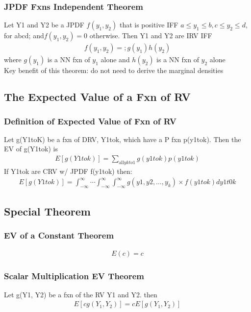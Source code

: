 \documentclass[12pt]{article}
\begin{document}
	\subsubsection{JPDF Fxns Independent Theorem}
		Let Y1 and Y2 be a JPDF $ f(y_1, y_2) $ that is positive IFF
		$ a\le y_1\le b, c\le y_2\le d $, for abcd; and$ f(y_1, y_2)= 0 $
		otherwise. Then Y1 and Y2 are IRV IFF
		\begin{align*}
			f(y_1, y_2) = ;g(y_1)h(y_2)
		\end{align*}
		where $ g(y_1) $ is a NN fxn of $ y_1 $ alone and $ h(y_2) $
		is a NN fxn of $ y_2 $ alone\\
		Key benefit of this theorem: do not need to derive the 
		marginal densities
\subsection{The Expected Value of a Fxn of RV}
	\subsubsection{Definition of Expected Value of Fxn of RV}
		Let g(Y1toK) be a fxn of DRV, Y1tok, which have a P fxn
		p(y1tok). Then the EV of g(Y1tok) is
		\begin{align*}
			E[g(Y1tok)] = \sum_{\text{all}ykto1}g(y1tok)p(y1tok)
		\end{align*}
		If Y1tok are CRV w/ JPDF f(y1tok) then:
		\begin{align*}
			E[g(Y1tok)] = \int_{-\infty }^{\infty }\cdots\int_{-\infty }
			^{\infty }\int_{-\infty }^{\infty }g(y1, y2, \dots , y_k)
			\times f(y1tok)dy1t0k
		\end{align*}
\subsection{Special Theorem}
	\subsubsection{EV of a Constant Theorem}
		\begin{align*}
			E(c) = c
		\end{align*}
	\subsubsection{Scalar Multiplication EV Theorem}
		Let g(Y1, Y2) be a fxn of the RV Y1 and Y2. then
		\begin{align*}
			E[cg(Y_1, Y_2)] = cE[g(Y_1, Y_2)]
		\end{align*}
\end{document}
